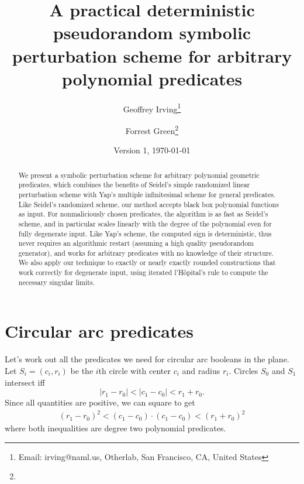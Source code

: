 \documentclass[11pt]{article}
\title{A practical deterministic pseudorandom symbolic perturbation scheme for arbitrary polynomial predicates}
\author{Geoffrey Irving\thanks{Email: irving@naml.us, Otherlab, San Francisco, CA, United States}
\and Forrest Green\thanks{\TODO}}
\date{Version 1, \today}
\begin{document}
\maketitle

\begin{abstract}
We present a symbolic perturbation scheme for arbitrary polynomial geometric predicates, which combines the benefits of
Seidel's simple randomized linear perturbation scheme with Yap's multiple infinitesimal scheme for general predicates.
Like Seidel's randomized scheme, our method accepts black box polynomial functions as input.
For nonmaliciously chosen predicates, the algorithm is as fast as Seidel's scheme, and in particular scales linearly
with the degree of the polynomial even for fully degenerate input.  Like Yap's scheme, the computed sign is deterministic,
thus never requires an algorithmic restart (assuming a high quality pseudorandom generator), and works for arbitrary
predicates with no knowledge of their structure.  We also apply our technique to exactly or nearly exactly rounded
constructions that work correctly for degenerate input, using iterated l'H\^opital's rule to compute the necessary
singular limits.
\end{abstract}

\section{Circular arc predicates}

Let's work out all the predicates we need for circular arc booleans in the plane.  Let $S_i = (c_i,r_i)$ be the $i$th
circle with center $c_i$ and radius $r_i$.  Circles $S_0$ and $S_1$ intersect iff
$$ | r_1 - r_0 | < |c_1 - c_0| < r_1 + r_0. $$
Since all quantities are positive, we can square to get
\begin{align} \label{two-circles}
(r_1 - r_0)^2 < (c_1 - c_0) \cdot (c_1 - c_0) < (r_1 + r_0)^2
\end{align}
where both inequalities are degree two polynomial predicates.
\end{document}

